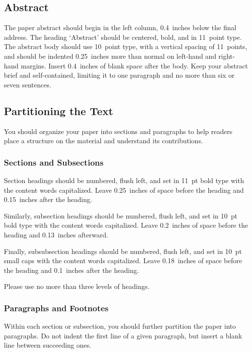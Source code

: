 \documentclass{article}
\begin{document}
\subsection{Abstract}

The paper abstract should begin in the left column, 0.4~inches below
the final address. The heading `Abstract' should be centered, bold,
and in 11~point type. The abstract body should use 10~point type, with
a vertical spacing of 11~points, and should be indented 0.25~inches
more than normal on left-hand and right-hand margins. Insert
0.4~inches of blank space after the body. Keep your abstract brief and 
self-contained,
limiting it to one paragraph and no more than six or seven sentences.

\subsection{Partitioning the Text} 

You should organize your paper into sections and paragraphs to help
readers place a structure on the material and understand its
contributions.

\subsubsection{Sections and Subsections}

Section headings should be numbered, flush left, and set in 11~pt bold
type with the content words capitalized. Leave 0.25~inches of space
before the heading and 0.15~inches after the heading.

Similarly, subsection headings should be numbered, flush left, and set
in 10~pt bold type with the content words capitalized. Leave
0.2~inches of space before the heading and 0.13~inches afterward.

Finally, subsubsection headings should be numbered, flush left, and
set in 10~pt small caps with the content words capitalized. Leave
0.18~inches of space before the heading and 0.1~inches after the
heading. 

Please use no more than three levels of headings.

\subsubsection{Paragraphs and Footnotes}

Within each section or subsection, you should further partition the
paper into paragraphs. Do not indent the first line of a given
paragraph, but insert a blank line between succeeding ones.
 
\end{document}
